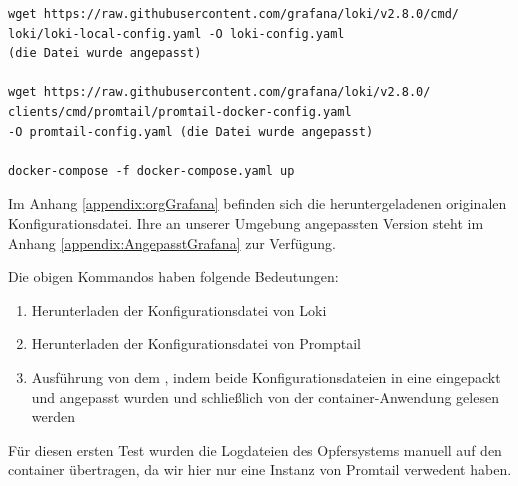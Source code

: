 {
\begin{lstlisting}[frame=single]
wget https://raw.githubusercontent.com/grafana/loki/v2.8.0/cmd/
loki/loki-local-config.yaml -O loki-config.yaml
(die Datei wurde angepasst)

wget https://raw.githubusercontent.com/grafana/loki/v2.8.0/
clients/cmd/promtail/promtail-docker-config.yaml
-O promtail-config.yaml (die Datei wurde angepasst)

docker-compose -f docker-compose.yaml up 
\end{lstlisting}
}

Im Anhang \ref{appendix:orgGrafana} befinden sich die heruntergeladenen originalen Konfigurationsdatei. Ihre an unserer Umgebung angepassten Version steht im Anhang \ref{appendix:AngepasstGrafana} zur Verfügung.

Die obigen Kommandos haben folgende Bedeutungen:
\begin{enumerate}[noitemsep]
   \item Herunterladen der Konfigurationsdatei von Loki
   \item Herunterladen der Konfigurationsdatei von Promptail
   \item Ausführung von dem , indem beide Konfigurationsdateien in eine eingepackt und angepasst wurden und schließlich von der \gls{container}-Anwendung gelesen werden
\end{enumerate}


Für diesen ersten Test wurden die Logdateien des Opfersystems manuell auf den \gls{container} übertragen, da wir hier nur eine Instanz von Promtail verwedent haben.


